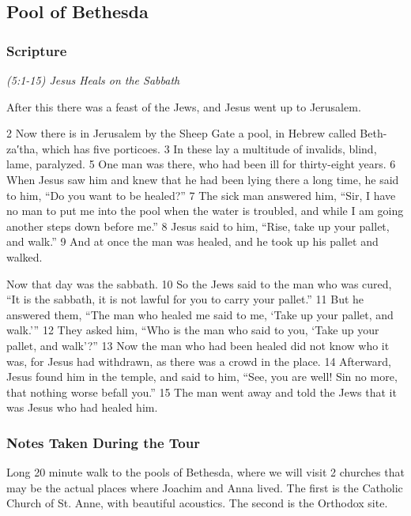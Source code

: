 \documentclass[letterpaper]{report}
\begin{document}
\clearpage
\subsection{Pool of Bethesda}
\begin{multicols}{2}
	\mbox{}
\end{multicols}
\subsubsection{Scripture}

{\centering
	\emph{(5:1-15) Jesus Heals on the Sabbath}\\
}
\begin{multicols}{2}
After this there was a feast of the Jews, and Jesus went up to Jerusalem.

2 Now there is in Jerusalem by the Sheep Gate a pool, in Hebrew called Beth-za′tha, which has five porticoes. 3 In these lay a multitude of invalids, blind, lame, paralyzed. 5 One man was there, who had been ill for thirty-eight years. 6 When Jesus saw him and knew that he had been lying there a long time, he said to him, “Do you want to be healed?” 7 The sick man answered him, “Sir, I have no man to put me into the pool when the water is troubled, and while I am going another steps down before me.” 8 Jesus said to him, “Rise, take up your pallet, and walk.” 9 And at once the man was healed, and he took up his pallet and walked.

Now that day was the sabbath. 10 So the Jews said to the man who was cured, “It is the sabbath, it is not lawful for you to carry your pallet.” 11 But he answered them, “The man who healed me said to me, ‘Take up your pallet, and walk.’” 12 They asked him, “Who is the man who said to you, ‘Take up your pallet, and walk’?” 13 Now the man who had been healed did not know who it was, for Jesus had withdrawn, as there was a crowd in the place. 14 Afterward, Jesus found him in the temple, and said to him, “See, you are well! Sin no more, that nothing worse befall you.” 15 The man went away and told the Jews that it was Jesus who had healed him.

\subsubsection{Notes Taken During the Tour}
Long 20 minute walk to the pools of Bethesda, where we will visit 2 churches that may be the actual places where Joachim and Anna lived. The first is the Catholic Church of St. Anne, with beautiful acoustics. The second is the Orthodox site.


\end{multicols}
\end{document}
